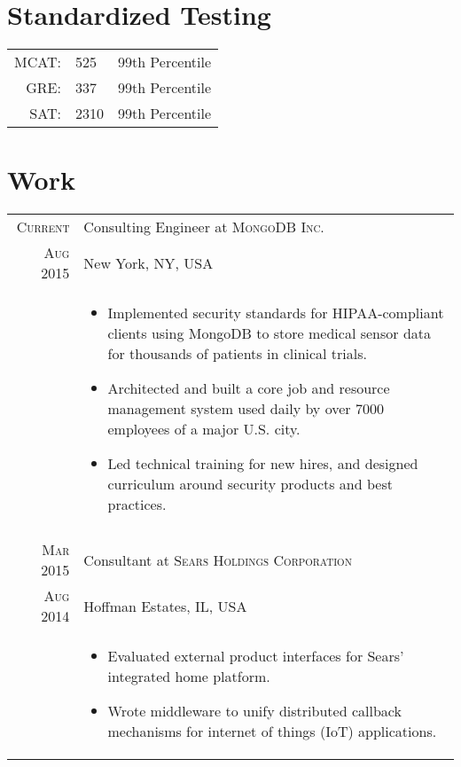 \documentclass[a4paper,10pt]{article}
\begin{document}
\section{Standardized Testing}
\begin{tabular}{rll}
\textsc{MCAT:}&525&99th Percentile\\
\textsc{GRE:}&337&99th Percentile\\
\textsc{SAT:}&2310&99th Percentile\\
\end{tabular}

\section{Work}
\begin{longtable}{r|p{11cm}}
 \nopagebreak \textsc{Current} & Consulting Engineer at \textsc{MongoDB Inc.}\\
 \nopagebreak \textsc{Aug 2015} & \small{New York, NY, USA} \\
 \nopagebreak & \footnotesize{
	\begin{itemize}
		\item[]{
			Implemented security standards for HIPAA-compliant clients
			using MongoDB to store medical sensor data for thousands
			of patients in clinical trials.
		}
		\item[]{
			Architected and built a core job and resource management system
			used daily by over 7000 employees of a major U.S. city.
		}
		\item[]{
			Led technical training for new hires, and designed curriculum
			around security products and best practices.
		}
	\end{itemize}
   }\\
 \multicolumn{2}{c}{} \\
 \nopagebreak \textsc{Mar 2015} & Consultant at \textsc{Sears Holdings Corporation}\\
 \nopagebreak \textsc{Aug 2014} & \small{Hoffman Estates, IL, USA}\\
 \nopagebreak & \footnotesize{
	\begin{itemize}
		\item[]{
			Evaluated external product interfaces for Sears' integrated home platform.
		}
		\item[]{
			Wrote middleware to unify distributed callback mechanisms for internet of things (IoT) applications.
		}
	\end{itemize}
   }\\

\end{longtable}
\end{document}
